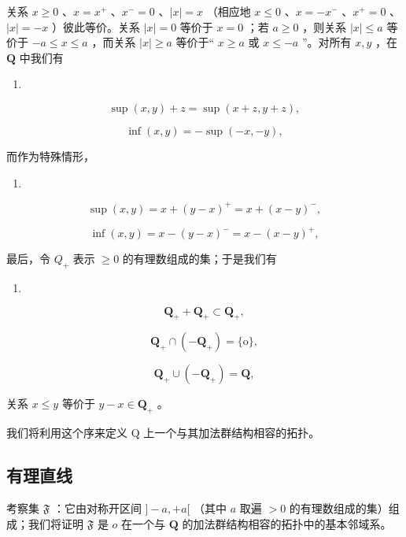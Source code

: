 关系 \(x \geqslant 0\) 、\(x = x^{+}\) 、\(x^{-} = 0\) 、\(|x| = x\) （相应地 \(x \leqslant 0\) 、\(x = -x^{-}\) 、\(x^{+} = 0\) 、\(|x| = -x\) ）彼此等价。关系 \(|x| = 0\) 等价于 \(x = 0\) ；若 \(a \geqslant 0\) ，则关系 \(|x| \leqslant a\) 等价于 \(-a \leqslant x \leqslant a\) ，而关系 \(|x| \geqslant a\) 等价于“ \(x \geqslant a\) 或 \(x \leqslant -a\) ”。对所有 \(x, y\) ，在 \(\mathbf{Q}\) 中我们有

\begin{enumerate}
\def\labelenumi{(\arabic{enumi})}
\setcounter{enumi}{3}
\tightlist
\item
\end{enumerate}

\[
\sup (x, y) + z = \sup (x + z, y + z),\tag{4}
\]

\[
\inf (x, y) = - \sup (- x, - y),\tag{5}
\]

而作为特殊情形，

\begin{enumerate}
\def\labelenumi{(\arabic{enumi})}
\setcounter{enumi}{5}
\tightlist
\item
\end{enumerate}

\[
\sup (x, y) = x + (y - x) ^ {+} = x + (x - y) ^ {-},\tag{6}
\]

\[
\inf (x, y) = x - (y - x) ^ {-} = x - (x - y) ^ {+},\tag{7}
\]

最后，令 \(Q_{+}\) 表示 \(\geqslant0\) 的有理数组成的集；于是我们有

\begin{enumerate}
\def\labelenumi{(\arabic{enumi})}
\setcounter{enumi}{7}
\tightlist
\item
\end{enumerate}

\[
\mathbf {Q} _ {+} + \mathbf {Q} _ {+} \subset \mathbf {Q} _ {+},\tag{8}
\]

\[
\mathbf {Q} _ {+} \cap (- \mathbf {Q} _ {+}) = \{\mathrm{o} \},\tag{9}
\]

\[
\mathbf {Q} _ {+} \cup (- \mathbf {Q} _ {+}) = \mathbf {Q},\tag{10}
\]

关系 \(x \leqslant y\) 等价于 \(y - x \in \mathbf{Q}_{+}\) 。

我们将利用这个序来定义 Q 上一个与其加法群结构相容的拓扑。

\subsection{有理直线}

考察集 \(\mathfrak{F}\) ：它由对称开区间 \(]-a, +a[\) （其中 \(a\) 取遍 \(>0\) 的有理数组成的集）组成；我们将证明 \(\mathfrak{F}\) 是 \(o\) 在一个与 \(\mathbf{Q}\) 的加法群结构相容的拓扑中的基本邻域系。


